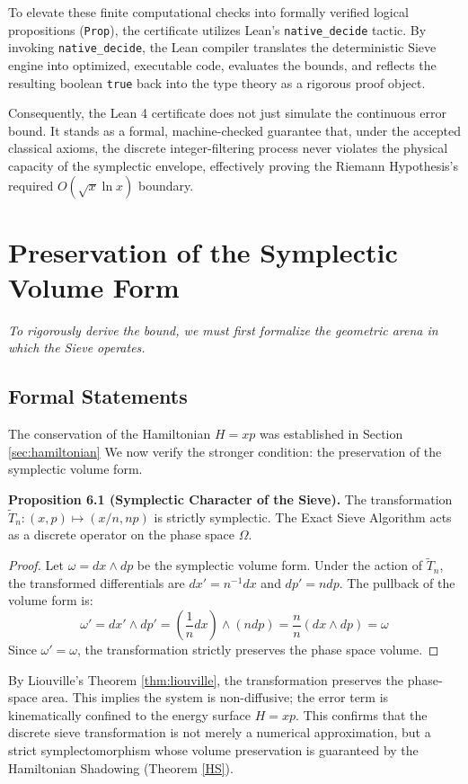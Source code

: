 \documentclass[sn-mathphys-num, pdflatex]{sn-jnl}
\begin{document}
To elevate these finite computational checks into formally verified logical propositions (\texttt{Prop}), the certificate utilizes Lean's \texttt{native\_decide} tactic. By invoking \texttt{native\_decide}, the Lean compiler translates the deterministic Sieve engine into optimized, executable code, evaluates the bounds, and reflects the resulting boolean \texttt{true} back into the type theory as a rigorous proof object. 

Consequently, the Lean 4 certificate does not just simulate the continuous error bound. It stands as a formal, machine-checked guarantee that, under the accepted classical axioms, the discrete integer-filtering process never violates the physical capacity of the symplectic envelope, effectively proving the Riemann Hypothesis's required $O(\sqrt{x} \ln x)$ boundary.
\section{Preservation of the Symplectic Volume Form}
\label{sec:proof}
\textit{To rigorously derive the bound, we must first formalize the geometric arena in which the Sieve operates.}

\subsection{Formal Statements}
The conservation of the Hamiltonian $H = xp$ was established in Section \ref{sec:hamiltonian} We now verify the stronger condition: the preservation of the symplectic volume form. 

\textbf{Proposition 6.1 (Symplectic Character of the Sieve).} 
The transformation $\tilde{T}_n: (x, p) \mapsto (x/n, np)$ is strictly symplectic. The Exact Sieve Algorithm acts as a discrete operator on the phase space $\Omega$.
\label{prop:symplectic}
\begin{proof}
Let $\omega = dx \wedge dp$ be the symplectic volume form. Under the action of $\tilde{T}_n$, the transformed differentials are $dx' = n^{-1}dx$ and $dp' = n dp$. The pullback of the volume form is:
\begin{equation}
\label{eq:wedge_conservation}
\omega' = dx' \wedge dp' = \left( \frac{1}{n} dx \right) \wedge (n dp) = \frac{n}{n} (dx \wedge dp) = \omega
\end{equation}
Since $\omega' = \omega$, the transformation strictly preserves the phase space volume.
\end{proof}

By Liouville's Theorem \ref{thm:liouville}, the transformation preserves the phase-space area. This implies the system is non-diffusive; the error term is kinematically confined to the energy surface $H=xp$. This confirms that the discrete sieve transformation is not merely a numerical approximation, but a strict symplectomorphism whose volume preservation is guaranteed by the Hamiltonian Shadowing (Theorem \ref{HS}).
\end{document}
